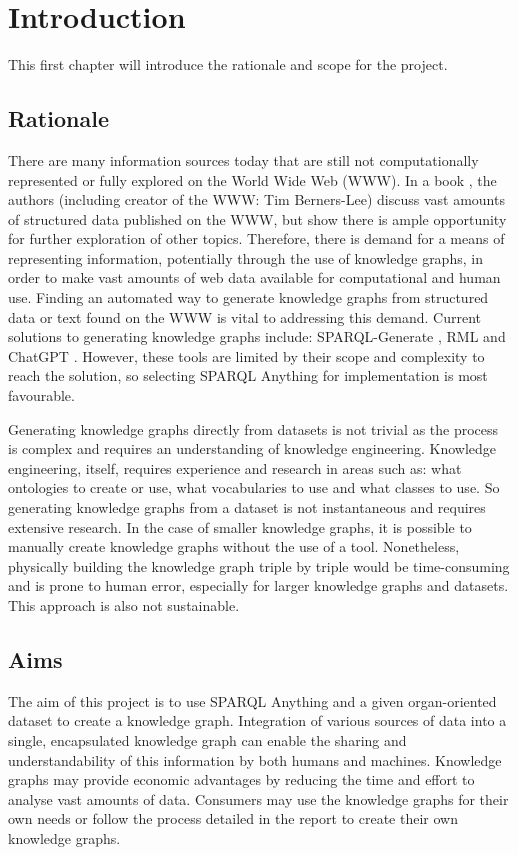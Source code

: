 \chapter{Introduction}
This first chapter will introduce the rationale and scope for the project.

\section{Rationale}
There are many information sources today that are still not computationally represented or fully explored on the World Wide Web (WWW). In a book \cite{bizer2011linked}, the authors (including creator of the WWW: Tim Berners-Lee) discuss vast amounts of structured data published on the WWW, but show there is ample opportunity for further exploration of other topics. Therefore, there is demand for a means of representing information, potentially through the use of knowledge graphs, in order to make vast amounts of web data available for computational and human use. Finding an automated way to generate knowledge graphs from structured data or text found on the WWW is vital to addressing this demand. Current solutions to generating knowledge graphs include: SPARQL-Generate \cite{sparqlgenerate}, RML \cite{rml} and ChatGPT \cite{chatgptwebsite}. However, these tools are limited by their scope and complexity to reach the solution, so selecting SPARQL Anything \cite{sparqlanythinggithub} for implementation is most favourable. 

Generating knowledge graphs directly from datasets is not trivial as the process is complex and requires an understanding of knowledge engineering. Knowledge engineering, itself, requires experience and research in areas such as: what ontologies to create or use, what vocabularies to use and what classes to use. So generating knowledge graphs from a dataset is not instantaneous and requires extensive research. In the case of smaller knowledge graphs, it is possible to manually create knowledge graphs without the use of a tool. Nonetheless, physically building the knowledge graph triple by triple would be time-consuming and is prone to human error, especially for larger knowledge graphs and datasets. This approach is also not sustainable. 

\section{Aims}
The aim of this project is to use SPARQL Anything and a given organ-oriented dataset to create a knowledge graph. Integration of various sources of data into a single, encapsulated knowledge graph can enable the sharing and understandability of this information by both humans and machines. Knowledge graphs may provide economic advantages by reducing the time and effort to analyse vast amounts of data. Consumers may use the knowledge graphs for their own needs or follow the process detailed in the report to create their own knowledge graphs.

